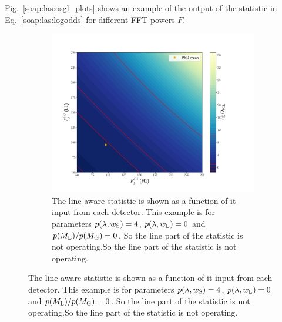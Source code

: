 Fig.~\ref{soap:las:osgl_plots} shows an example of the output of the statistic in Eq.~\ref{soap:las:logodds} for different \gls{FFT} powers $F$.
\begin{figure}
\centering

\begin{subfigure}[h]{\linewidth}
\begin{minipage}{0.65\linewidth}
\includegraphics[width=0.9\linewidth]{C3_soap/lookup_noline.pdf}
\end{minipage}\hfill
\begin{minipage}{0.35\linewidth}
\caption{The line-aware statistic is shown as a function of it input from each detector. This example is for parameters $p(\lambda,w_{\rm{S}}) = 4$, $p(\lambda,w_{\rm{L}}) = 0$ and $p(M_{\rm{L}})/p(M_{\rm{G}}) = 0$. So the line part of the statistic is not operating.So the line part of the statistic is not
operating.}
\label{soap:las:detp:noline}
\end{minipage}
\end{subfigure}


\end{figure}
